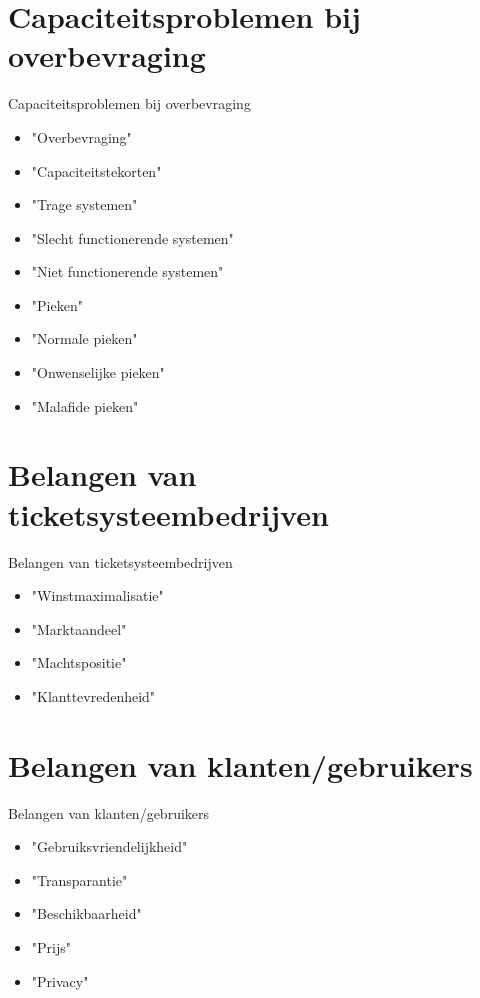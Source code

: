 \documentclass{beamer}
\begin{document}
\section{Capaciteitsproblemen bij overbevraging}
\begin{frame}{Capaciteitsproblemen bij overbevraging}
    \begin{itemize}
        \item "Overbevraging"
        \item "Capaciteitstekorten"
        \item "Trage systemen"
        \item "Slecht functionerende systemen"
        \item "Niet functionerende systemen"
        \item "Pieken"
        \item "Normale pieken"
        \item "Onwenselijke pieken"
        \item "Malafide pieken"
    \end{itemize}
\end{frame}

\section{Belangen van ticketsysteembedrijven}
\begin{frame}{Belangen van ticketsysteembedrijven}
    \begin{itemize}
        \item "Winstmaximalisatie"
        \item "Marktaandeel"
        \item "Machtspositie"
        \item "Klanttevredenheid"
    \end{itemize}
\end{frame}

\section{Belangen van klanten/gebruikers}
\begin{frame}{Belangen van klanten/gebruikers}
    \begin{itemize}
        \item "Gebruiksvriendelijkheid"
        \item "Transparantie"
        \item "Beschikbaarheid"
        \item "Prijs"
        \item "Privacy"
    \end{itemize}
\end{frame}
    
\end{document}
